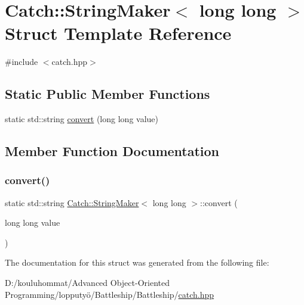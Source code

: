 \hypertarget{struct_catch_1_1_string_maker_3_01long_01long_01_4}{}\section{Catch\+:\+:String\+Maker$<$ long long $>$ Struct Template Reference}
\label{struct_catch_1_1_string_maker_3_01long_01long_01_4}


{\ttfamily \#include $<$catch.\+hpp$>$}

\subsection*{Static Public Member Functions}
\begin{DoxyCompactItemize}
\item 
static std\+::string \mbox{\hyperlink{struct_catch_1_1_string_maker_3_01long_01long_01_4_a7a58929dca2a14c576d7d6d08bc615d2}{convert}} (long long value)
\end{DoxyCompactItemize}


\subsection{Member Function Documentation}
\mbox{\label{struct_catch_1_1_string_maker_3_01long_01long_01_4_a7a58929dca2a14c576d7d6d08bc615d2}} 
\subsubsection{\texorpdfstring{convert()}{convert()}}
{\footnotesize\ttfamily static std\+::string \mbox{\hyperlink{struct_catch_1_1_string_maker}{Catch\+::\+String\+Maker}}$<$ long long $>$\+::convert (\begin{DoxyParamCaption}\item[{long long}]{value }\end{DoxyParamCaption})\hspace{0.3cm}{\ttfamily [static]}}



The documentation for this struct was generated from the following file\+:\begin{DoxyCompactItemize}
\item 
D\+:/kouluhommat/\+Advanced Object-\/\+Oriented Programming/lopputyö/\+Battleship/\+Battleship/\mbox{\hyperlink{catch_8hpp}{catch.\+hpp}}\end{DoxyCompactItemize}
